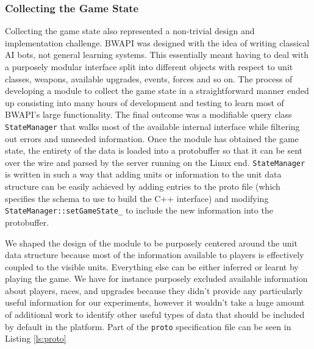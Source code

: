 
\subsubsection{Collecting the Game State}

Collecting the game state also represented a non-trivial design and
implementation challenge. BWAPI was designed with the idea of writing classical
AI bots, not general learning systems. This essentially meant having to deal
with a purposely modular interface split into different objects with respect to
unit classes, weapons, available upgrades, events, forces and so on. The process
of developing a module to collect the game state in a straightforward manner
ended up consisting into many hours of development and testing to learn most of
BWAPI's large functionality. The final outcome was a modifiable query class
\texttt{StateManager} that walks most of the available internal interface while
filtering out errors and unneeded information. Once the module has obtained the
game state, the entirety of the data is loaded into a protobuffer so that it can
be sent over the wire and parsed by the server running on the Linux end.
\texttt{StateManager} is written in such a way that adding units or information
to the unit data structure can be easily achieved by adding entries to the proto
file (which specifies the schema to use to build the C++ interface) and
modifying \texttt{StateManager::setGameState\_} to include the new information
into the protobuffer.

We shaped the design of the module to be purposely centered around the unit data
structure because most of the information available to players is effectively
coupled to the visible units. Everything else can be either inferred or learnt
by playing the game. We have for instance purposely excluded available
information about players, races, and upgrades because they didn't provide any
particularly useful information for our experiments, however it wouldn't take a
huge amount of additional work to identify other useful types of data that
should be included by default in the platform. Part of the \texttt{proto}
specification file can be seen in Listing \ref{ls:proto}

